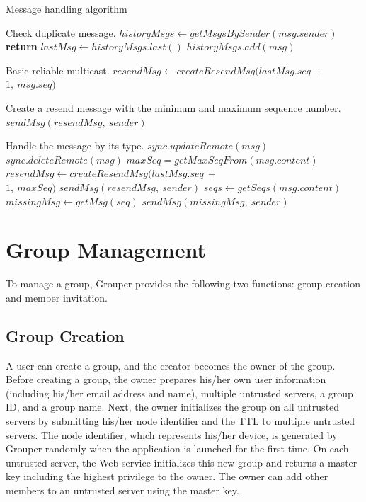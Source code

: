 \documentclass[a4paper,11pt]{report}
\begin{document}
\begin{algorithm}[t]
	\caption{Message handling algorithm}\label{alg:euclid}
	\begin{algorithmic}[1]		
		\LeftComment Check duplicate message.
		\State  $historyMsgs \gets getMsgsBySender(msg.sender)$
		\State \textbf{return}
		\EndIf
		\State $lastMsg \gets historyMsgs.last()$
		\State $historyMsgs.add(msg)$
		
		\LeftComment Basic reliable multicast.
		\State $resendMsg \gets createResendMsg(lastMsg.seq\ +\ $ \\\hspace{2.7cm} $1,\ msg.seq)$
		
		\Comment Create a resend message with the minimum and maximum sequence number.
		\State $sendMsg(resendMsg,\ sender)$
		\EndIf
		
		\LeftComment Handle the message by its type.
		\State $sync.updateRemote(msg)$
		\State $sync.deleteRemote(msg)$
		\State $maxSeq = getMaxSeqFrom(msg.content)$
		\State $resendMsg \gets createResendMsg(lastMsg.seq\ +\ $ \\\hspace{2.7cm}  $1,\ maxSeq)$
		\State $sendMsg(resendMsg,\ sender)$
		\EndIf
		\State $seqs \gets getSeqs(msg.content)$
		\State $missingMsg \gets getMsg(seq)$
		\State $sendMsg(missingMsg,\ sender)$
		\EndFor
		\EndIf
		\EndProcedure
	\end{algorithmic}
	\label{algorithm:receive_message}
\end{algorithm}

\section{Group Management}  \label{section:group_management}

To manage a group, Grouper provides the following two functions: group creation and member invitation.

\subsection{Group Creation}

A user can create a group, and the creator becomes the owner of the group.  
Before creating a group, the owner prepares his/her own user information (including his/her email address and name), multiple untrusted servers, a group ID, and a group name. 
Next, the owner initializes the group on all untrusted servers by submitting his/her node identifier and the TTL to multiple untrusted servers. 
The node identifier, which represents his/her device, is generated by Grouper randomly when the application is launched for the first time. 
On each untrusted server, the Web service initializes this new group and returns a master key including the highest privilege to the owner. 
The owner can add other members to an untrusted server using the master key.
\end{document}
